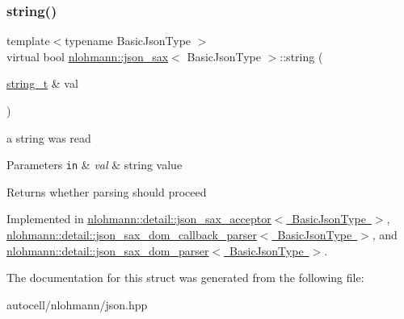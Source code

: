 \subsubsection{\texorpdfstring{string()}{string()}}
{\footnotesize\ttfamily template$<$typename Basic\+Json\+Type $>$ \\
virtual bool \mbox{\hyperlink{structnlohmann_1_1json__sax}{nlohmann\+::json\+\_\+sax}}$<$ Basic\+Json\+Type $>$\+::string (\begin{DoxyParamCaption}\item[{\mbox{\hyperlink{structnlohmann_1_1json__sax_ae01977a9f3c5b3667b7a2929ed91061e}{string\+\_\+t}} \&}]{val }\end{DoxyParamCaption})\hspace{0.3cm}{\ttfamily [pure virtual]}}



a string was read 


\begin{DoxyParams}[1]{Parameters}
\mbox{\tt in}  & {\em val} & string value \\
\hline
\end{DoxyParams}
\begin{DoxyReturn}{Returns}
whether parsing should proceed 
\end{DoxyReturn}


Implemented in \mbox{\hyperlink{classnlohmann_1_1detail_1_1json__sax__acceptor_a72e61155545d43bb829c9a9211978300}{nlohmann\+::detail\+::json\+\_\+sax\+\_\+acceptor$<$ Basic\+Json\+Type $>$}}, \mbox{\hyperlink{classnlohmann_1_1detail_1_1json__sax__dom__callback__parser_aadc7fe390bdd8fb721b6789bd80a5903}{nlohmann\+::detail\+::json\+\_\+sax\+\_\+dom\+\_\+callback\+\_\+parser$<$ Basic\+Json\+Type $>$}}, and \mbox{\hyperlink{classnlohmann_1_1detail_1_1json__sax__dom__parser_a1c0e1e24fb803e358f63fcb5c1d1e4ee}{nlohmann\+::detail\+::json\+\_\+sax\+\_\+dom\+\_\+parser$<$ Basic\+Json\+Type $>$}}.



The documentation for this struct was generated from the following file\+:\begin{DoxyCompactItemize}
\item 
autocell/nlohmann/json.\+hpp\end{DoxyCompactItemize}
